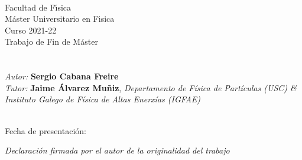\documentclass[12 pt, a4paper]{article} %
\numberwithin{equation}{section}
\numberwithin{figure}{section}
\numberwithin{table}{section}
\begin{document}
	
	
	\mbox{}
	\mbox{}\hfill{\large \DataDefensa} \vspace{1cm}
	\begin{center}
	\end{center}
	
	
	\clearpage
	\mbox{}
	\clearpage %
	
	
	\mbox{}\\
	Facultad de F\'{\i}sica\\
	Máster Universitario en F\'{\i}sica \\  
	Curso 2021-22\\%
	{\sc Trabajo de Fin de Máster}\vspace{3cm}\\
	{\sc\LARGE \TituloDoTraballo}\vspace{1cm}\\
	{\sl\large \EspecialidadeMaster}\vspace{2cm}\\
	{\sl Autor:} {\bf Sergio Cabana Freire}\\ %
	{\sl Tutor:} {\bf Jaime Álvarez Muñiz}, {\sl Departamento de Física de Partículas (USC) \& Instituto Galego de Física de Altas Enerxías (IGFAE)}\\
	\vspace{1cm}\\
	
	\mbox{}
	
	\mbox{}\hfill{Fecha de presentaci\'on: \DataDefensa}
	
	
	\clearpage
	
	\thispagestyle{empty}
	\pagebreak
	
	{\sl Declaraci\'on firmada por el autor de la originalidad del trabajo}
	
\end{document}
